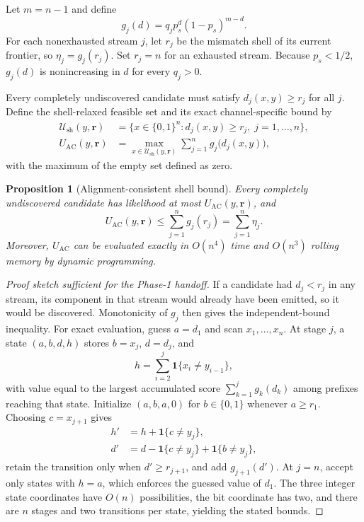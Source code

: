\documentclass[11pt]{article}
\newtheorem{proposition}[theorem]{Proposition}
\theoremstyle{definition}
\theoremstyle{remark}
\newcommand{\ind}{\mathbf{1}}
\begin{document}
Let $m=n-1$ and define
\[
 g_j(d)=q_jp_s^d(1-p_s)^{m-d}.
\]
For each nonexhausted stream $j$, let $r_j$ be the mismatch shell of its current frontier, so $\eta_j=g_j(r_j)$. Set $r_j=n$ for an exhausted stream. Because $p_s<1/2$, $g_j(d)$ is nonincreasing in $d$ for every $q_j>0$.

Every completely undiscovered candidate must satisfy $d_j(x,y)\ge r_j$ for all $j$. Define the shell-relaxed feasible set and its exact channel-specific bound by
\begin{align}
 \mathcal U_{\mathrm{sh}}(y,\mathbf r)
 &=\{x\in\{0,1\}^n:d_j(x,y)\ge r_j,\;j=1,\ldots,n\},\\
 U_{\mathrm{AC}}(y,\mathbf r)
 &=\max_{x\in\mathcal U_{\mathrm{sh}}(y,\mathbf r)}
   \sum_{j=1}^n g_j\bigl(d_j(x,y)\bigr),
\end{align}
with the maximum of the empty set defined as zero.

\begin{proposition}[Alignment-consistent shell bound]
\label{prop:ac}
Every completely undiscovered candidate has likelihood at most $U_{\mathrm{AC}}(y,\mathbf r)$, and
\[
 U_{\mathrm{AC}}(y,\mathbf r)
 \le \sum_{j=1}^n g_j(r_j)
 =\sum_{j=1}^n\eta_j.
\]
Moreover, $U_{\mathrm{AC}}$ can be evaluated exactly in $O(n^4)$ time and $O(n^3)$ rolling memory by dynamic programming.
\end{proposition}

\begin{proof}[Proof sketch sufficient for the Phase-1 handoff]
If a candidate had $d_j<r_j$ in any stream, its component in that stream would already have been emitted, so it would be discovered. Monotonicity of $g_j$ then gives the independent-bound inequality. For exact evaluation, guess $a=d_1$ and scan $x_1,\ldots,x_n$. At stage $j$, a state $(a,b,d,h)$ stores $b=x_j$, $d=d_j$, and
\[
 h=\sum_{i=2}^{j}\ind\{x_i\ne y_{i-1}\},
\]
with value equal to the largest accumulated score $\sum_{k=1}^{j}g_k(d_k)$ among prefixes reaching that state. Initialize $(a,b,a,0)$ for $b\in\{0,1\}$ whenever $a\ge r_1$. Choosing $c=x_{j+1}$ gives
\begin{align*}
 h'&=h+\ind\{c\ne y_j\},\\
 d'&=d-\ind\{c\ne y_j\}+\ind\{b\ne y_j\},
\end{align*}
retain the transition only when $d'\ge r_{j+1}$, and add $g_{j+1}(d')$. At $j=n$, accept only states with $h=a$, which enforces the guessed value of $d_1$. The three integer state coordinates have $O(n)$ possibilities, the bit coordinate has two, and there are $n$ stages and two transitions per state, yielding the stated bounds.
\end{proof}
\end{document}
